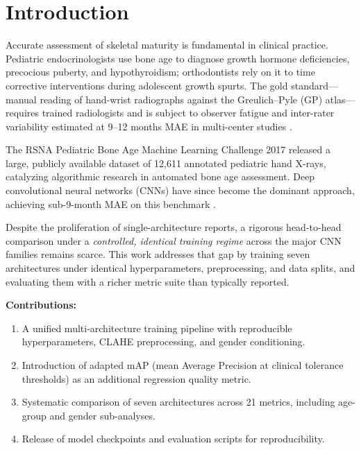 \documentclass[conference]{IEEEtran}
\begin{document}
\section{Introduction}

Accurate assessment of skeletal maturity is fundamental in clinical
practice. Pediatric endocrinologists use bone age to diagnose growth
hormone deficiencies, precocious puberty, and hypothyroidism;
orthodontists rely on it to time corrective interventions during
adolescent growth spurts. The gold standard—manual reading of
hand-wrist radiographs against the Greulich--Pyle (GP) atlas—requires
trained radiologists and is subject to observer fatigue and
inter-rater variability estimated at 9--12 months MAE in multi-center
studies \cite{greulich1959radiographic, tanner1983assessment}.

The RSNA Pediatric Bone Age Machine Learning Challenge 2017 \cite{rsna2017}
released a large, publicly available dataset of 12{,}611 annotated
pediatric hand X-rays, catalyzing algorithmic research in automated
bone age assessment. Deep convolutional neural networks (CNNs) have
since become the dominant approach, achieving sub-9-month MAE on this
benchmark \cite{larson2018performance}.

Despite the proliferation of single-architecture reports, a rigorous
head-to-head comparison under a \emph{controlled, identical training
regime} across the major CNN families remains scarce. This work
addresses that gap by training seven architectures under identical
hyperparameters, preprocessing, and data splits, and evaluating them
with a richer metric suite than typically reported.

\textbf{Contributions:}
\begin{enumerate}
  \item A unified multi-architecture training pipeline with reproducible
        hyperparameters, CLAHE preprocessing, and gender conditioning.
  \item Introduction of adapted mAP (mean Average Precision at clinical
        tolerance thresholds) as an additional regression quality metric.
  \item Systematic comparison of seven architectures across 21 metrics,
        including age-group and gender sub-analyses.
  \item Release of model checkpoints and evaluation scripts for
        reproducibility.
\end{enumerate}

\end{document}
